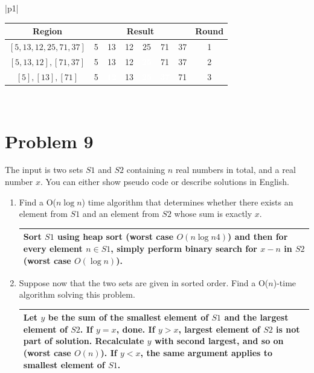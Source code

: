 \documentclass[10pt]{article}
\newenvironment{answer}
    {\begin{center}
    \begin{tabular}{|p{1\textwidth}|}
    \hline
    }
    { 
    \\\hline
    \end{tabular} 
    \end{center}
    }
\begin{document}
\begin{answer}
  \begin{center}
    \begin{tabular}{c|c|c|c|c|c|c|c}
      \textbf{Region} & \multicolumn{6}{c|}{\textbf{Result}} & \textbf{Round}  \\
      \hline
      $[5,13,12,25,71,37]$ & 5 & 13 & 12 & 25 & 71 & 37 & \multirow{1}{*}{1} \\  
      \hline
      $[5,13,12], [71,37] $ & 5 & 13 & 12 & \cellcolor{black}\textcolor{white}{\textbf{25}}& 71 & 37 & \multirow{1}{*}{2} \\  
      \hline
      $[5],[13],[71]$ & 5 & \cellcolor{black}\textcolor{white}{\textbf{12}} & 13 & \cellcolor{black}\textcolor{white}{\textbf{25}} & \cellcolor{black}\textcolor{white}{\textbf{37}} & 71 & \multirow{1}{*}{3} \\
      \hline
    \end{tabular} 
  \end{center}
\end{answer}
\newpage
\section*{Problem 9}
The input is two sets $S1$ and $S2$ containing $n$ real numbers in total, and a real number $x$. You can either show pseudo code or describe solutions in English.

\begin{enumerate}[label=\alph*.]
\item Find a O($n\log n$) time algorithm that determines whether there
  exists an element from $S1$ and an element from $S2$ whose sum is
  exactly $x$.
  \begin{answer}
    Sort $S1$ using heap sort (worst case $O(n\log n4)$) and then for every element $n \in S1$, simply perform binary search for $x-n$ in $S2$ (worst case $O(\log n)$).
  \end{answer}
\item Suppose now that the two sets are given in sorted order. Find a O($n$)-time algorithm solving this problem.
  \begin{answer}
    Let $y$ be the sum of the smallest element of $S1$ and the largest element of $S2$. If $y = x$, done. If $y > x$, largest element of $S2$ is not part of solution. Recalculate $y$ with second largest, and so on (worst case $O(n)$). If $y < x$, the same argument applies to smallest element of $S1$. 
  \end{answer}
\end{enumerate}
\end{document}
